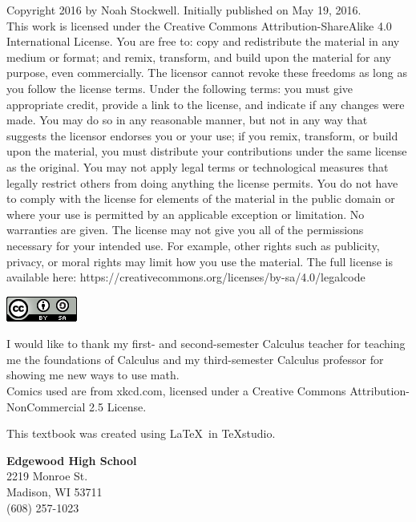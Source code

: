 \documentclass[../revisedmain.tex]{subfiles}
\begin{document}
	Copyright 2016 by Noah Stockwell. Initially published on May 19, 2016.\\
	 This work is licensed under the Creative Commons Attribution-ShareAlike 4.0 International License. You are free to: copy and redistribute the material in any medium or format; and remix, transform, and build upon the material for any purpose, even commercially. The licensor cannot revoke these freedoms as long as you follow the license terms. Under the following terms: you must give appropriate credit, provide a link to the license, and indicate if any changes were made. You may do so in any reasonable manner, but not in any way that suggests the licensor endorses you or your use; if you remix, transform, or build upon the material, you must distribute your contributions under the same license as the original. You may not apply legal terms or technological measures that legally restrict others from doing anything the license permits. You do not have to comply with the license for elements of the material in the public domain or where your use is permitted by an applicable exception or limitation. No warranties are given. The license may not give you all of the permissions necessary for your intended use. For example, other rights such as publicity, privacy, or moral rights may limit how you use the material. The full license is available here: https://creativecommons.org/licenses/by-sa/4.0/legalcode\\
	\begin{center}\includegraphics[width=.5in]{images/license}\end{center}\vfill I would like to thank my first- and second-semester Calculus teacher for teaching me the foundations of Calculus and my third-semester Calculus professor for showing me new ways to use math.\\\vfill
	Comics used are from xkcd.com, licensed under a Creative Commons Attribution-NonCommercial 2.5 License.\\
	\vspace{.25in}\par This textbook was created using \LaTeX\, in TeXstudio.\\
	\vspace{.25in}
	\begin{flushright}
	\textbf{Edgewood High School}\\
	2219 Monroe St.\\ Madison, WI 53711\\ (608) 257-1023
	\end{flushright}
\end{document}
